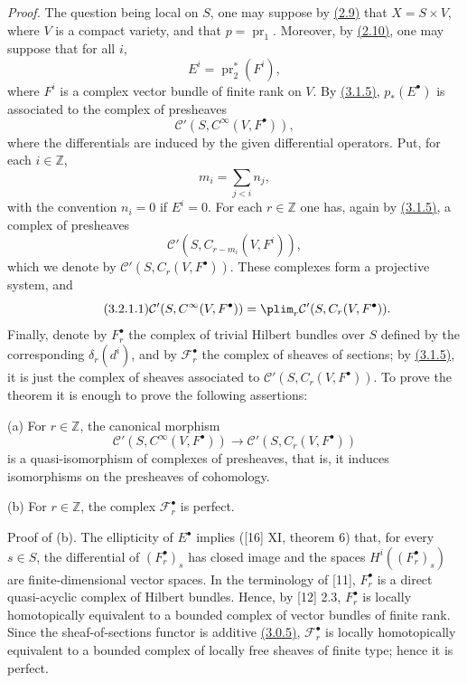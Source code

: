 \emph{Proof.} The question being local on $S$, one may suppose by \hyperlink{sga6.e02.cor.2-9}{(2.9)} that $X=S\times V$, where $V$ is a compact variety, and that $p=\operatorname{pr}_1$. Moreover, by \hyperlink{sga6.e02.cor.2-10}{(2.10)}, one may suppose that for all $i$,
\[
 E^i=\operatorname{pr}_2^*(F^i),
\]
where $F^i$ is a complex vector bundle of finite rank on $V$. By \hyperlink{sga6.e02.para.3-1-5}{(3.1.5)}, $p_*(E^\bullet)$ is associated to the complex of presheaves
\[
 \mathcal C'(S,C^\infty(V,F^\bullet)),
\]
where the differentials are induced by the given differential operators. Put, for each $i\in\mathbb Z$,
\[
 m_i=\sum_{j<i}n_j,
\]
with the convention $n_i=0$ if $E^i=0$. For each $r\in\mathbb Z$ one has, again by \hyperlink{sga6.e02.para.3-1-5}{(3.1.5)}, a complex of presheaves
\[
 \mathcal C'(S,C_{r-m_i}(V,F^i)),
\]
which we denote by $\mathcal C'(S,C_r(V,F^\bullet))$. These complexes form a projective system, and
\begin{equation}\tag{3.2.1.1}
 \mathcal C'(S,C^\infty(V,F^\bullet))
 =\plim_r \mathcal C'(S,C_r(V,F^\bullet)).
\end{equation}
Finally, denote by $F_r^\bullet$ the complex of trivial Hilbert bundles over $S$ defined by the corresponding $\delta_r(d^i)$, and by $\mathcal F_r^\bullet$ the complex of sheaves of sections; by \hyperlink{sga6.e02.para.3-1-5}{(3.1.5)}, it is just the complex of sheaves associated to $\mathcal C'(S,C_r(V,F^\bullet))$. To prove the theorem it is enough to prove the following assertions:

(a) For $r\in\mathbb Z$, the canonical morphism
\[
 \mathcal C'(S,C^\infty(V,F^\bullet))\longrightarrow \mathcal C'(S,C_r(V,F^\bullet))
\]
is a quasi-isomorphism of complexes of presheaves, that is, it induces isomorphisms on the presheaves of cohomology.

(b) For $r\in\mathbb Z$, the complex $\mathcal F_r^\bullet$ is perfect.

Proof of (b). The ellipticity of $E^\bullet$ implies ([16] XI, theorem 6) that, for every $s\in S$, the differential of $(F_r^\bullet)_s$ has closed image and the spaces $H^i((F_r^\bullet)_s)$ are finite-dimensional vector spaces. In the terminology of [11], $F_r^\bullet$ is a direct quasi-acyclic complex of Hilbert bundles. Hence, by [12] 2.3, $F_r^\bullet$ is locally homotopically equivalent to a bounded complex of vector bundles of finite rank. Since the sheaf-of-sections functor is additive \hyperlink{sga6.e02.para.3-0-5}{(3.0.5)}, $\mathcal F_r^\bullet$ is locally homotopically equivalent to a bounded complex of locally free sheaves of finite type; hence it is perfect.

